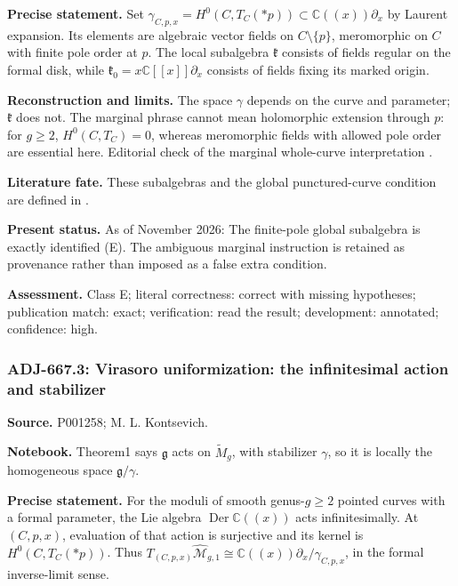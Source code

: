 \noindent\textbf{Precise statement.} Set \(\gamma_{C,p,x}=H^0(C,T_C(*p))\subset\mathbb C((x))\partial_x\) by Laurent expansion. Its elements are algebraic vector fields on \(C\setminus\{p\}\), meromorphic on \(C\) with finite pole order at \(p\). The local subalgebra \(\mathfrak k\) consists of fields regular on the formal disk, while \(\mathfrak k_0=x\mathbb C[[x]]\partial_x\) consists of fields fixing its marked origin.\par

\noindent\textbf{Reconstruction and limits.} The space \(\gamma\) depends on the curve and parameter; \(\mathfrak k\) does not. The marginal phrase  cannot mean holomorphic extension through \(p\): for \(g\ge2\), \(H^0(C,T_C)=0\), whereas meromorphic fields with allowed pole order are essential here. Editorial check of the marginal whole-curve interpretation \ours.\par

\noindent\textbf{Literature fate.} These subalgebras and the global punctured-curve condition are defined in \citet[\S1]{kontsevich1987virasoro}.\par

\noindent\textbf{Present status.} As of November 2026: The finite-pole global subalgebra is exactly identified (E). The ambiguous marginal instruction is retained as provenance rather than imposed as a false extra condition.\par

\noindent\textbf{Assessment.} Class E; literal correctness: correct with missing hypotheses; publication match: exact; verification: read the result; development: annotated; confidence: high.\par

\subsubsection{ADJ-667.3: Virasoro uniformization: the infinitesimal action and stabilizer}
\noindent\textbf{Source.} P001258; M. L. Kontsevich.\par
\noindent\textbf{Notebook.} Theorem1 says \(\mathfrak g\) acts on \(\widetilde M_g\), with stabilizer \(\gamma\), so it is locally the homogeneous space \(\mathfrak g/\gamma\).\par

\noindent\textbf{Precise statement.} For the moduli of smooth genus-\(g\ge2\) pointed curves with a formal parameter, the Lie algebra \(\operatorname{Der}\mathbb C((x))\) acts infinitesimally. At \((C,p,x)\), evaluation of that action is surjective and its kernel is \(H^0(C,T_C(*p))\). Thus \(T_{(C,p,x)}\widehat{\mathcal M}_{g,1}\cong\mathbb C((x))\partial_x/\gamma_{C,p,x}\), in the formal inverse-limit sense.\par

